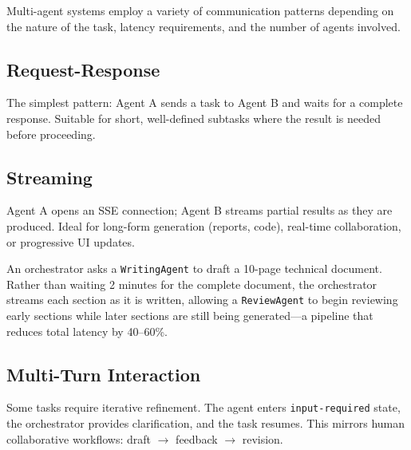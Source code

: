 Multi-agent systems employ a variety of communication patterns depending on the nature of the task, latency requirements, and the number of agents involved.

\subsection{Request-Response}
\label{request-response}

The simplest pattern: Agent A sends a task to Agent B and waits for a complete response. Suitable for short, well-defined subtasks where the result is needed before proceeding.

\subsection{Streaming}
\label{streaming}

Agent A opens an SSE connection; Agent B streams partial results as they are produced. Ideal for long-form generation (reports, code), real-time collaboration, or progressive UI updates.

\begin{examplebox}
An orchestrator asks a \texttt{WritingAgent} to draft a 10-page technical document. Rather than waiting 2 minutes for the complete document, the orchestrator streams each section as it is written, allowing a \texttt{ReviewAgent} to begin reviewing early sections while later sections are still being generated---a pipeline that reduces total latency by 40--60\%.
\end{examplebox}

\subsection{Multi-Turn Interaction}
\label{multi-turn-interaction}

Some tasks require iterative refinement. The agent enters \texttt{input-required} state, the orchestrator provides clarification, and the task resumes. This mirrors human collaborative workflows: draft $\to$ feedback $\to$ revision.

